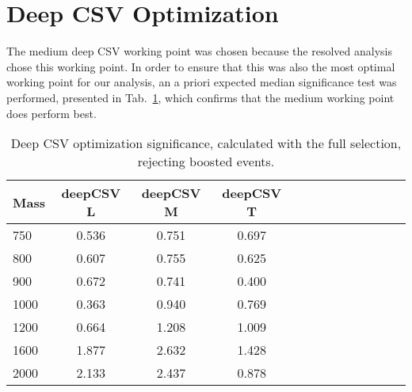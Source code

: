 \section{Deep CSV Optimization\label{app:deepCSV}}

The medium deep CSV working point was chosen because the resolved analysis chose this working point. In order to ensure that this was also the most optimal working point for our analysis, an a priori expected median significance test was performed, presented in Tab.~\ref{tab:dcsvopt}, which confirms that the medium working point does perform best.

\begin{table}[h]
\begin{tabular}{|l|c|c|c|c|c|c|c|c|c|c|c|c|}
\hline
Mass & deepCSV L & deepCSV M & deepCSV T\\ \hline
750 & 0.536 & 0.751 & 0.697\\
800 & 0.607 & 0.755 &0.625\\
900 &  0.672 &0.741 & 0.400\\
1000 &  0.363 &0.940 & 0.769\\
1200 &  0.664& 1.208 & 1.009\\
1600 &  1.877 &2.632 & 1.428\\
2000 &  2.133  &2.437 & 0.878\\
\hline
\end{tabular}
\caption{Deep CSV optimization significance, calculated with the full selection, rejecting boosted events.}\label{tab:dcsvopt}
\end{table}

